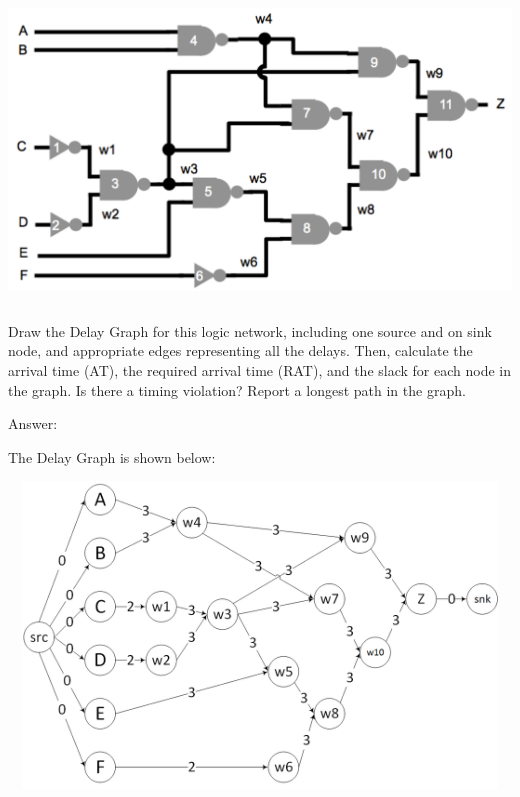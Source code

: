 \documentclass[12pt]{article}
\begin{document}
    \begin{center}
        \includegraphics[width = 5.60in, height = 3.20in]{figure1.png}
    \end{center}

    \noindent
    Draw the Delay Graph for this logic network, including one source and on sink node,
    and appropriate edges representing all the delays. Then, calculate the arrival
    time (AT), the required arrival time (RAT), and the slack for each node in the
    graph. Is there a timing violation? Report a longest path in the graph.

    \vspace{12pt}

    \noindent
    Answer:

    \noindent
    The Delay Graph is shown below:

    \begin{center}
        \includegraphics[width = 5.60in, height = 3.20in]{figure2.png}
    \end{center}
\end{document}
